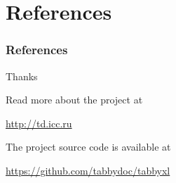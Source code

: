 \documentclass{beamer}
\begin{document}
\section{References}

\begin{frame}[allowframebreaks]
\frametitle{References}
\tiny


\end{frame}

\begin{frame}
\Huge{\centerline{Thanks}}
\bigskip
\footnotesize{\centerline{Read more about the project at}}
\scriptsize{\centerline{\url{http://td.icc.ru}}}

\bigskip
\footnotesize{\centerline{The project source code is available at}}
\scriptsize{\centerline{\url{https://github.com/tabbydoc/tabbyxl}}}
\end{frame}

\end{document}
